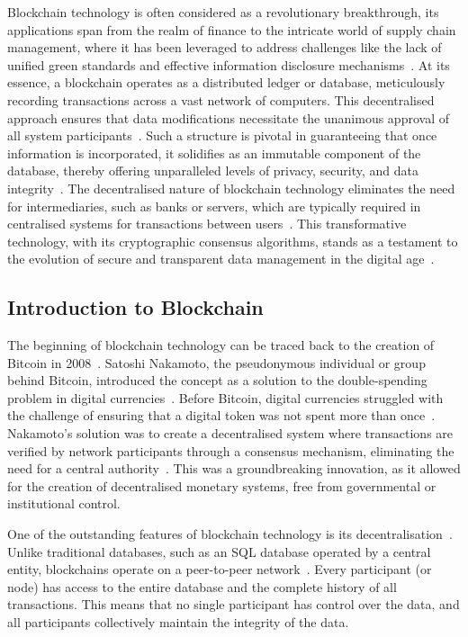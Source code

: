 Blockchain technology is often considered as a revolutionary breakthrough, its applications span from the realm of finance to the intricate world of supply chain management, where it has been leveraged to address challenges like the lack of unified green standards and effective information disclosure mechanisms~\cite{Zhou.2023}. At its essence, a blockchain operates as a distributed ledger or database, meticulously recording transactions across a vast network of computers. This decentralised approach ensures that data modifications necessitate the unanimous approval of all system participants~\cite{Zhang.2022}. Such a structure is pivotal in guaranteeing that once information is incorporated, it solidifies as an immutable component of the database, thereby offering unparalleled levels of privacy, security, and data integrity~\cite{Pingale.2021}. The decentralised nature of blockchain technology eliminates the need for intermediaries, such as banks or servers, which are typically required in centralised systems for transactions between users~\cite{Pingale.2021}. This transformative technology, with its cryptographic consensus algorithms, stands as a testament to the evolution of secure and transparent data management in the digital age~\cite{Pingale.2021}.

\subsection{Introduction to Blockchain}
The beginning of blockchain technology can be traced back to the creation of Bitcoin in 2008~\cite{Nakamoto.2009}. Satoshi Nakamoto, the pseudonymous individual or group behind Bitcoin, introduced the concept as a solution to the double-spending problem in digital currencies~\cite{Nakamoto.2009}. Before Bitcoin, digital currencies struggled with the challenge of ensuring that a digital token was not spent more than once~\cite{Chiu.2022}. Nakamoto's solution was to create a decentralised system where transactions are verified by network participants through a consensus mechanism, eliminating the need for a central authority~\cite{Chiu.2022}. This was a groundbreaking innovation, as it allowed for the creation of decentralised monetary systems, free from governmental or institutional control.

One of the outstanding features of blockchain technology is its decentralisation~\cite{Gencer.2018}. Unlike traditional databases, such as an SQL database operated by a central entity, blockchains operate on a peer-to-peer network~\cite{Gencer.2018}. Every participant (or node) has access to the entire database and the complete history of all transactions. This means that no single participant has control over the data, and all participants collectively maintain the integrity of the data.

